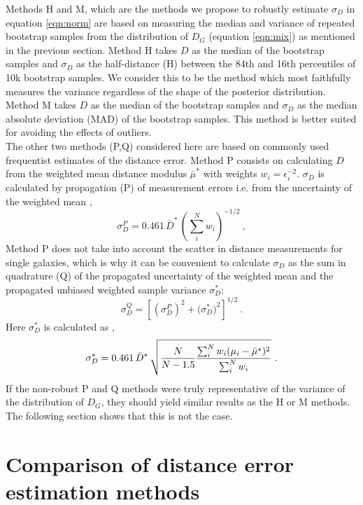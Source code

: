 \documentclass[a4paper,fleqn,usenatbib]{mnras}
\begin{document}
Methods H and M, which are the methods we propose to robustly estimate $\sigma_D$ in equation \ref{eqn:norm} are based on measuring the median and variance of repeated bootstrap samples from the distribution of $D_G$ (equation \ref{eqn:mix}) as mentioned in the previous section. Method H takes $D$ as the median of the bootstrap samples and $\sigma_D$ as the half-distance (H) between  the 84th and 16th percentiles of 10k bootstrap samples. We consider this to be the method which most faithfully measures the variance regardless of the shape of the posterior distribution. Method M takes $D$ as the median of the bootstrap samples and $\sigma_D$ as the median absolute deviation (MAD) of the bootstrap samples. This method is better suited for avoiding the effects of outliers.\\

The other two methods (P,Q) considered here are based on commonly used frequentist estimates of the distance error. Method P consists on calculating $D$ from the weighted mean distance modulus $\bar{\mu}^*$ with weights $w_i=\epsilon_i^{-2}$. $\sigma_D$ is calculated by propagation (P) of measurement errors  i.e. from the uncertainty of the weighted mean \citep{cosmicflows},
\begin{equation}
\sigma_D^P=0.461\,\bar{D}^*\,\left(\sum_i^Nw_i\right)^{-1/2} \ ,
\end{equation}
Method P does not take into account the scatter in distance measurements for single galaxies, which is why it can be convenient to calculate $\sigma_D$ as the sum in quadrature (Q) of the propagated uncertainty of the weighted mean and the propagated unbiased weighted sample variance $\sigma_D^*$:
\begin{equation}
\sigma_D^Q=\left[ \left(\sigma_D^P\right)^2+\Big(\sigma_D^*\Big)^2\right]^{1/2} \ .
\end{equation}
Here $\sigma^*_D$ is calculated as  \citep{wstdev},
\begin{equation}
\sigma^*_D=0.461\,\bar{D}^*\,\sqrt{\frac{N}{N-1.5}\frac{\sum_i^Nw_i(\mu_i-\bar{\mu}^*)^2}{\sum_i^Nw_i}\vphantom{\Biggl(}}\ .
\end{equation}
If the non-robust P and Q methods were truly representative of the variance of the distribution of $D_G$, they should yield similar results as the H or M methods. The following section shows that this is not the case.

\section{Comparison of distance error estimation methods}
\label{sec:comp} 
\end{document}
